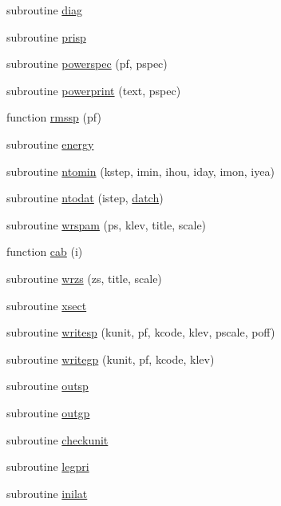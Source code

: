 \begin{DoxyCompactItemize}
\item 
subroutine \hyperlink{puma_8f90_ad0981694b4fc7644f20d9ad785deba27}{diag}
\item 
subroutine \hyperlink{puma_8f90_a901150c868c1f2d65744ec49df0c24ed}{prisp}
\item 
subroutine \hyperlink{puma_8f90_a8625954404de5b08c55626c4f8a62972}{powerspec} (pf, pspec)
\item 
subroutine \hyperlink{puma_8f90_a53adeff6424dd4b2f124771625a47ca5}{powerprint} (text, pspec)
\item 
function \hyperlink{puma_8f90_a87f2e4ed3831dc32e18d25fe42d0bfab}{rmssp} (pf)
\item 
subroutine \hyperlink{puma_8f90_a9617b01410b9d0a76ca6ceb1b333bb96}{energy}
\item 
subroutine \hyperlink{puma_8f90_a6628dcb7258ff7477a7bc7f3098cded3}{ntomin} (kstep, imin, ihou, iday, imon, iyea)
\item 
subroutine \hyperlink{puma_8f90_a6b0de7569cc691823dd1104ff42a6993}{ntodat} (istep, \hyperlink{pumax_8c_a3c3df9a533eb74fcdcd614a15a8026dc}{datch})
\item 
subroutine \hyperlink{puma_8f90_a7d2fe5c057c4ef8c0b7981ddeb0cce41}{wrspam} (ps, klev, title, scale)
\item 
function \hyperlink{puma_8f90_a41d141fdb78d222639310fec575eaea5}{cab} (i)
\item 
subroutine \hyperlink{puma_8f90_a03b2185c8a9dc75ed4169a7d9bf65863}{wrzs} (zs, title, scale)
\item 
subroutine \hyperlink{puma_8f90_a8e59ae6d7b5a22b0e46c56187cdd62cf}{xsect}
\item 
subroutine \hyperlink{puma_8f90_a29f97b19d997b3a5c29df1fd4cdd4792}{writesp} (kunit, pf, kcode, klev, pscale, poff)
\item 
subroutine \hyperlink{puma_8f90_a8f8e06ff9c98bc44f6c356d5ffc0a426}{writegp} (kunit, pf, kcode, klev)
\item 
subroutine \hyperlink{puma_8f90_a0352cc6bbeedace31c54d9afba847ad6}{outsp}
\item 
subroutine \hyperlink{puma_8f90_a1f5ebb3d7ab8cc007a6ed2d81b858f03}{outgp}
\item 
subroutine \hyperlink{puma_8f90_ab608e12bdff55ab600a9d975673c5a53}{checkunit}
\item 
subroutine \hyperlink{puma_8f90_a03d027a1b5f735efb9bce2396d5fc2b6}{legpri}
\item 
subroutine \hyperlink{puma_8f90_a7780f6c3a813605c014f7da964ff83d2}{inilat}
\item 

\end{DoxyCompactItemize}
